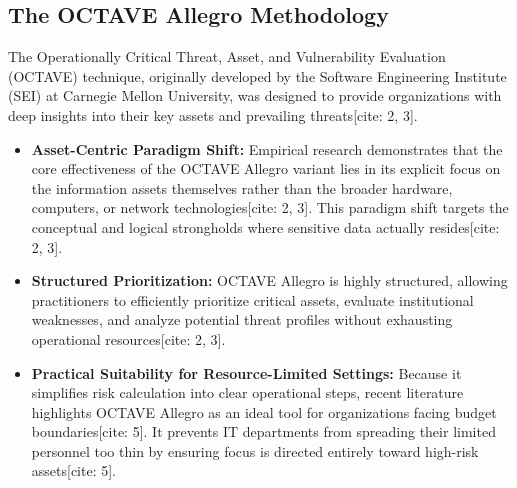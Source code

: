 \documentclass[journal,onecolumn,12pt,twoside]{IEEEtran}
\begin{document}
	\subsection{The OCTAVE Allegro Methodology}
	\label{subsec:octave_allegro_review}
	The Operationally Critical Threat, Asset, and Vulnerability Evaluation (OCTAVE) technique, originally developed by the Software Engineering Institute (SEI) at Carnegie Mellon University, was designed to provide organizations with deep insights into their key assets and prevailing threats[cite: 2, 3]. 
	\begin{itemize}
		\item \textbf{Asset-Centric Paradigm Shift:} Empirical research demonstrates that the core effectiveness of the OCTAVE Allegro variant lies in its explicit focus on the information assets themselves rather than the broader hardware, computers, or network technologies[cite: 2, 3]. This paradigm shift targets the conceptual and logical strongholds where sensitive data actually resides[cite: 2, 3].
		\item \textbf{Structured Prioritization:} OCTAVE Allegro is highly structured, allowing practitioners to efficiently prioritize critical assets, evaluate institutional weaknesses, and analyze potential threat profiles without exhausting operational resources[cite: 2, 3].
		\item \textbf{Practical Suitability for Resource-Limited Settings:} Because it simplifies risk calculation into clear operational steps, recent literature highlights OCTAVE Allegro as an ideal tool for organizations facing budget boundaries[cite: 5]. It prevents IT departments from spreading their limited personnel too thin by ensuring focus is directed entirely toward high-risk assets[cite: 5].
	\end{itemize}
	
\end{document}
